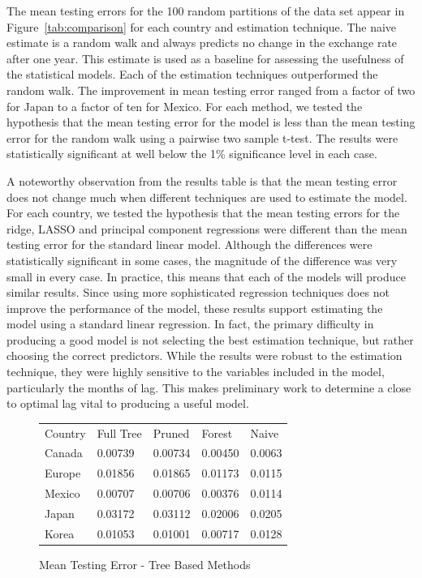 \documentclass{sig-alternate-05-2015}
\begin{document}
The mean testing errors for the 100 random partitions of the data set appear in Figure~\ref{tab:comparison} for each country and estimation technique. The naive estimate is a random walk and always predicts no change in the exchange rate after one year. This estimate is used as a baseline for assessing the usefulness of the statistical models. Each of the estimation techniques outperformed the random walk. The improvement in mean testing error ranged from a factor of two for Japan to a factor of ten for Mexico. For each method, we tested the hypothesis that the mean testing error for the model is less than the mean testing error for the random walk using a pairwise two sample t-test. The results were statistically significant at well below the 1\% significance level in each case.
\par{} A noteworthy observation from the results table is that the mean testing error does not change much when different techniques are used to estimate the model. For each country, we tested the hypothesis that the mean testing errors for the ridge, LASSO and principal component regressions were different than the mean testing error for the standard linear model. Although the differences were statistically significant in some cases, the magnitude of the difference was very small in every case. In practice, this means that each of the models will produce similar results. Since using more sophisticated regression techniques does not improve the performance of the model, these results support estimating the model using a standard linear regression. In fact, the primary difficulty in producing a good model is not selecting the best estimation technique, but rather choosing the correct predictors. While the results were robust to the estimation technique, they were highly sensitive to the variables included in the model, particularly the months of lag. This makes preliminary work to determine a close to optimal lag vital to producing a useful model.

\begin{figure}
\centering
\caption{Mean Testing Error - Tree Based Methods}
\begin{tabular}{l l l l l}
Country	& Full Tree & Pruned    & Forest    & Naive \\
Canada 	& 0.00739 	& 0.00734 	& 0.00450 	& 0.0063 \\
Europe	& 0.01856 	& 0.01865 	& 0.01173	& 0.0115 \\
Mexico	& 0.00707 	& 0.00706 	& 0.00376   & 0.0114 \\
Japan	& 0.03172 	& 0.03112 	& 0.02006   & 0.0205 \\
Korea	& 0.01053 	& 0.01001 	& 0.00717	& 0.0128 \\
\end{tabular}
\label{tab:treecomparison}
\end{figure} 
\end{document}
